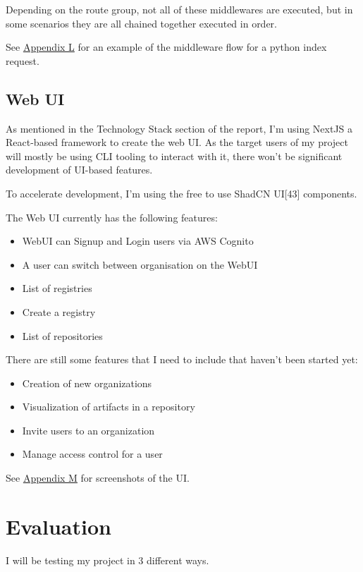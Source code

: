 \documentclass{article}
\begin{document}
  Depending on the route group, not all of these middlewares are executed, but in some scenarios they are all chained together executed in order.

  See \hyperref[sec:appendix-l]{Appendix L} for an example of the middleware flow for a python index request.

  \subsection{Web UI}

  As mentioned in the Technology Stack section of the report, I'm using NextJS a React-based framework to create the web UI. As the target users of my project will mostly be using CLI tooling to interact with it, there won't be significant development of UI-based features.

  To accelerate development, I'm using the free to use ShadCN UI[43] components.

  The Web UI currently has the following features:
  \begin{itemize}
    \item WebUI can Signup and Login users via AWS Cognito
    \item A user can switch between organisation on the WebUI
    \item List of registries
    \item Create a registry
    \item List of repositories
  \end{itemize}

  There are still some features that I need to include that haven't been started yet:
  \begin{itemize}
    \item Creation of new organizations
    \item Visualization of artifacts in a repository
    \item Invite users to an organization
    \item Manage access control for a user
  \end{itemize}

  See \hyperref[sec:appendix-m]{Appendix M} for screenshots of the UI.

  \section{Evaluation}

  I will be testing my project in 3 different ways.
\end{document}
